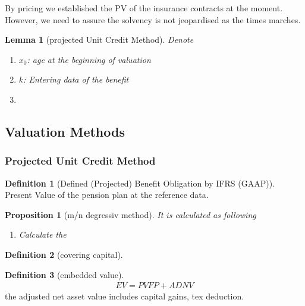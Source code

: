 \documentclass[a4paper,11pt]{book}
\newtheorem{lemma}[theorem]{Lemma}
\newtheorem{proposition}[theorem]{Proposition}
\theoremstyle{definition}
\newtheorem{definition}{Definition}[section]
\theoremstyle{remark}
\begin{document}
By pricing we established the PV of the insurance contracts at the moment. However, we need to assure the solvency is not jeopardised as the times marches. 



\begin{lemma}[projected Unit Credit Method]
	Denote 
	\begin{enumerate}
		\item $x_0$: age at the beginning of valuation
		\item $k$: Entering data of the benefit
		\item 
	\end{enumerate}
\end{lemma}

\subsection{Valuation Methods}
\subsubsection{Projected Unit Credit Method}
\begin{definition}[Defined (Projected) Benefit Obligation by IFRS (GAAP)]
Present Value of the pension plan at the reference data.
\end{definition}


\begin{proposition}[m/n degressiv method]
	It is calculated as following 
	\begin{enumerate}
		\item Calculate the 
	\end{enumerate}
\end{proposition}



\begin{definition}[covering capital]
\end{definition}


\begin{definition}[embedded value]
\begin{align*}
	EV = PVFP + ADNV
\end{align*}
the adjusted net asset value includes capital gains, tex deduction. 
\end{definition}
\end{document}
